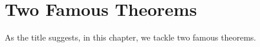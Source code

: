 \chapter{Two Famous Theorems}

As the title suggests, in this chapter, we tackle two famous theorems.